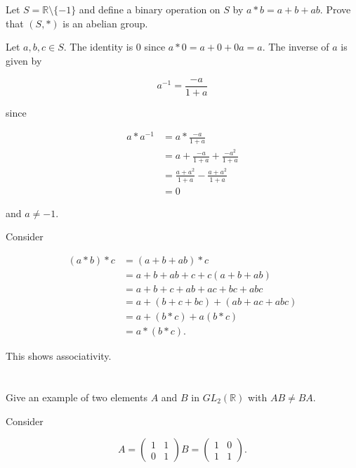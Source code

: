 \documentclass[a4paper]{article}
\begin{document}
\section{}

Let $S = \mathbb{R} \setminus \{ -1 \}$ and define a binary operation on $S$ by $a * b = a + b + ab$. Prove that $(S, *)$ is an abelian group.

\vspace{\baselineskip}

Let $a, b, c \in S$. The identity is 0 since $a * 0 = a + 0 + 0a = a$. The inverse of $a$ is given by 

$$ a^{-1} = \frac{-a}{1+a}$$

since

\begin{align*}
a * a^{-1} &= a * \frac{-a}{1+a} \\
&= a + \frac{-a}{1+a} + \frac{-a^2}{1+a} \\
&= \frac{a + a^2}{1+a} - \frac{a + a^2}{1+a} \\
&= 0
\end{align*}

and $a \neq -1$.

Consider

\begin{align*}
(a * b) * c &= (a + b + ab) * c \\
&= a + b + ab + c + c (a + b + ab) \\
&= a + b + c + ab + ac + bc + abc \\
&= a + (b + c + bc) + (ab + ac + abc) \\
&= a + (b * c) + a (b * c) \\
&= a * (b * c).
\end{align*}

This shows associativity.

\section{}

Give an example of two elements $A$ and $B$ in $GL_2(\mathbb{R})$ with $AB \neq BA$.

\vspace{\baselineskip}

Consider

$$A=
  \begin{pmatrix}
    1 & 1 \\
    0 & 1
  \end{pmatrix}
  B=
  \begin{pmatrix}
    1 & 0 \\
    1 & 1
  \end{pmatrix}.
$$
\end{document}
